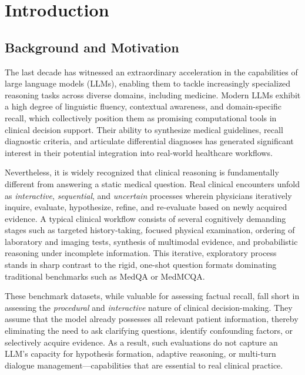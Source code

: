 
\chapter{Introduction} 

\label{Chapter 1} 


\section{Background and Motivation}

The last decade has witnessed an extraordinary acceleration in the capabilities of large language models (LLMs), enabling them to tackle increasingly specialized reasoning tasks across diverse domains, including medicine. Modern LLMs exhibit a high degree of linguistic fluency, contextual awareness, and domain-specific recall, which collectively position them as promising computational tools in clinical decision support. Their ability to synthesize medical guidelines, recall diagnostic criteria, and articulate differential diagnoses has generated significant interest in their potential integration into real-world healthcare workflows.

Nevertheless, it is widely recognized that clinical reasoning is fundamentally different from answering a static medical question. Real clinical encounters unfold as \textit{interactive}, \textit{sequential}, and \textit{uncertain} processes wherein physicians iteratively inquire, evaluate, hypothesize, refine, and re-evaluate based on newly acquired evidence. A typical clinical workflow consists of several cognitively demanding stages such as targeted history-taking, focused physical examination, ordering of laboratory and imaging tests, synthesis of multimodal evidence, and probabilistic reasoning under incomplete information. This iterative, exploratory process stands in sharp contrast to the rigid, one-shot question formats dominating traditional benchmarks such as MedQA or MedMCQA.

These benchmark datasets, while valuable for assessing factual recall, fall short in assessing the \textit{procedural} and \textit{interactive} nature of clinical decision-making. They assume that the model already possesses all relevant patient information, thereby eliminating the need to ask clarifying questions, identify confounding factors, or selectively acquire evidence. As a result, such evaluations do not capture an LLM’s capacity for hypothesis formation, adaptive reasoning, or multi-turn dialogue management—capabilities that are essential to real clinical practice.

